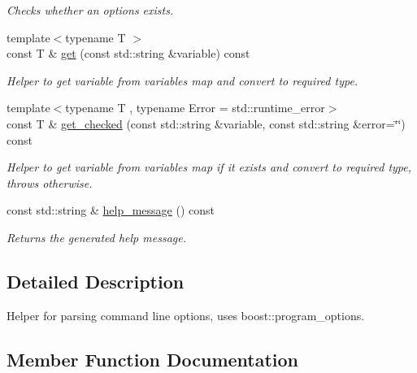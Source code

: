 \begin{DoxyCompactItemize}
\begin{DoxyCompactList}\small\item\em Checks whether an options exists. \end{DoxyCompactList}\item 
{\footnotesize template$<$typename T $>$ }\\const T \& \hyperlink{classsocketplay_1_1ProgramOptionsParser_a8274716f6f8e0c90129a58c1b41f3019}{get} (const std\+::string \&variable) const 
\begin{DoxyCompactList}\small\item\em Helper to get variable from variables map and convert to required type. \end{DoxyCompactList}\item 
{\footnotesize template$<$typename T , typename Error  = std\+::runtime\+\_\+error$>$ }\\const T \& \hyperlink{classsocketplay_1_1ProgramOptionsParser_a0e21c08094d0a39d2d279be420f488da}{get\+\_\+checked} (const std\+::string \&variable, const std\+::string \&error=\char`\"{}\char`\"{}) const 
\begin{DoxyCompactList}\small\item\em Helper to get variable from variables map if it exists and convert to required type, throws otherwise. \end{DoxyCompactList}\item 
const std\+::string \& \hyperlink{classsocketplay_1_1ProgramOptionsParser_a69004585fa3208758ec67930f5e384ac}{help\+\_\+message} () const \hypertarget{classsocketplay_1_1ProgramOptionsParser_a69004585fa3208758ec67930f5e384ac}{}\label{classsocketplay_1_1ProgramOptionsParser_a69004585fa3208758ec67930f5e384ac}

\begin{DoxyCompactList}\small\item\em Returns the generated help message. \end{DoxyCompactList}\end{DoxyCompactItemize}


\subsection{Detailed Description}
Helper for parsing command line options, uses boost\+::program\+\_\+options. 

\subsection{Member Function Documentation}
